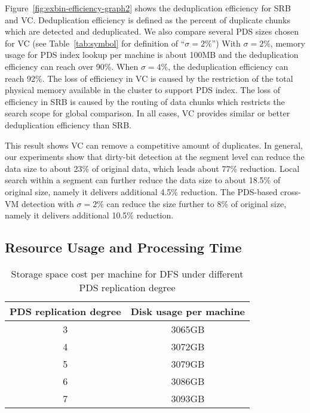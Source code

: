Figure~\ref{fig:exbin-efficiency-graph2} shows the deduplication efficiency for SRB and VC.
Deduplication efficiency is defined as the percent of duplicate chunks
which are detected and deduplicated. We also compare several PDS sizes chosen for VC
(see Table~\ref{tab:symbol} for definition of ``$\sigma=2\%$'')
With $\sigma=2\%$, memory usage for PDS index lookup per machine is about 100MB
and  the deduplication efficiency can reach over 90\%.
When $\sigma=4\%$, the deduplication efficiency can reach 92\%. 
The loss of efficiency in VC is caused by the restriction of the total physical memory available
in the cluster to support PDS index.  
The loss of efficiency in SRB is caused by the routing of data chunks which restricts the search scope
for global comparison.
In all cases, VC provides similar or better deduplication efficiency than SRB.

This result shows VC can remove  a competitive amount of duplicates.
In general, our experiments show that
dirty-bit detection at the segment level  can reduce the data size to about 23\% of original data, 
which leads  about 77\% reduction.
Local search within a segment can   further reduce the data size
to about 18.5\% of original size, namely it delivers additional 4.5\% reduction.
The PDS-based cross-VM detection with $\sigma=2\% $
can reduce the  size further to 8\% of original size, namely it 
delivers additional 10.5\% reduction.

\subsection{Resource Usage and Processing Time}
\begin{table}
    \begin{tabular}{|c|c|}
    \hline
    PDS replication degree & Disk usage per machine  \\ \hline
    3                      & 3065GB             \\ \hline
    4                      & 3072GB             \\ \hline
    5                      & 3079GB             \\ \hline
    6                      & 3086GB             \\ \hline
    7                      & 3093GB             \\ \hline
    \end{tabular}
\caption{Storage space cost per machine for DFS under different PDS replication degree}
\label{tab:replication_cost}
\end{table}

